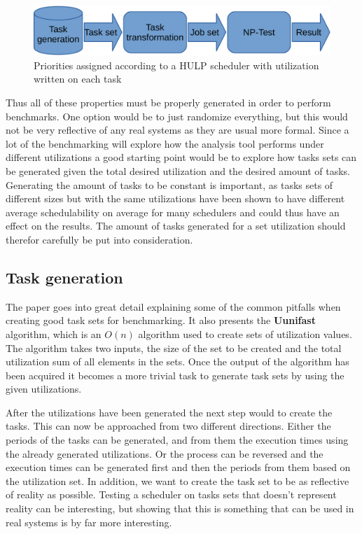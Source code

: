 \documentclass{kththesis}
\begin{document}
\begin{figure}

    \centering

    \includegraphics[width=0.8\linewidth]{images/benchmark_toolchain.pdf}

    \caption{Priorities assigned according to a HULP scheduler with utilization written on each task}

    \label{fig:benchmark_toolchain}

\end{figure}


Thus all of these properties must be properly generated in order to perform benchmarks. One option
would be to just randomize everything, but this would not be very reflective of any real systems as
they are usual more formal. Since a lot of the benchmarking will explore how the analysis tool
performs under different utilizations a good starting point would be to explore how tasks sets can
be generated given the total desired utilization and the desired amount of tasks. Generating the
amount of tasks to be constant is important, as tasks sets of different sizes but with the same
utilizations have been shown to have different average
schedulability\parencite{sebestyen_simulation-based_2012} on average for many schedulers and could
thus have an effect on the results. The amount of tasks generated for a set utilization should
therefor carefully be put into consideration. 


\subsection{Task generation}

The paper \parencite{bini_measuring_2005} goes into great detail explaining some of the common pitfalls
when creating good task sets for benchmarking. It also presents the \textbf{Uunifast} algorithm,
which is an $O(n)$ algorithm used to create sets of utilization values. The algorithm takes two
inputs, the size of the set to be created and the total utilization sum of all elements in the sets.
Once the output of the algorithm has been acquired it becomes a more trivial task to generate task
sets by using the given utilizations.

After the utilizations have been generated the next step would to create the tasks. This can now be
approached from two different directions. Either the periods of the tasks can be generated, and from
them the execution times using the already generated utilizations. Or the process can be reversed
and the execution times can be generated first and then the periods from them based on the
utilization set. In addition, we want to create the task set to be as reflective of reality as
possible. Testing a scheduler on tasks sets that doesn't represent reality can be interesting, but
showing that this is something that can be used in real systems is by far more interesting.
\end{document}

